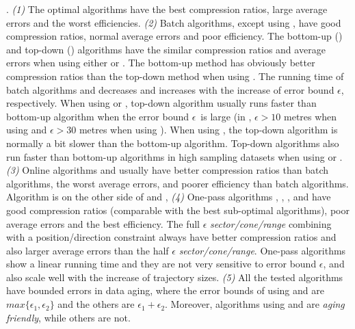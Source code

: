 {.
\emph{(1)} The optimal algorithms have the best compression ratios, large average errors and the worst efficiencies.
%
\emph{(2)} Batch algorithms, except \dpa using \dad, have good compression ratios, normal average errors and poor efficiency.
%
The bottom-up (\tpa) and top-down (\dpa) algorithms have the similar compression ratios and average errors when using either \ped or \sed. The bottom-up method has obviously better compression ratios than the top-down method when using \dad.
%
The running time of batch algorithms \dpa and \tpa decreases and increases with the increase of error bound $\epsilon$, respectively. When using \ped or \sed, top-down algorithm \dpa usually runs faster than bottom-up algorithm \tpa when the error bound $\epsilon$~is large  (\eg in \geolife, $\epsilon >10$ metres when using \ped and $\epsilon >30$ metres when using \sed). When using \dad, the top-down algorithm is normally a bit slower than the bottom-up algorithm.
Top-down algorithms also run faster than bottom-up algorithms in high sampling datasets when using \ped or \sed.
%
\emph{(3)} Online algorithms \opwa and \bqsa usually have better compression ratios than batch algorithms, the worst average errors, and poorer efficiency than batch algorithms. Algorithm \squishe is on the other side of \opwa and \bqsa,
%
\emph{(4)} One-pass algorithms \operb, \siped, \cised, \intersec and \interval have good compression ratios (comparable with the best sub-optimal algorithms), poor average errors and the best efficiency.
%
The full $\epsilon$ \emph{sector/cone/range} combining with a position/direction constraint always have better compression ratios and also larger average errors than the half $\epsilon$ \emph{sector/cone/range}. %
%
One-pass algorithms show a linear running time and they are not very sensitive to error bound $\epsilon$, and also scale well with the increase of trajectory sizes.
%
\emph{(5)} {All the tested algorithms have bounded errors in data aging, where the error bounds of \dpa using \ped and \sed are $max\{\epsilon_1, \epsilon_2\}$ and the others are $\epsilon_1 + \epsilon_2$. Moreover, algorithms \dpa using \ped and \sed are \emph{aging friendly}, while others are not. }

}

